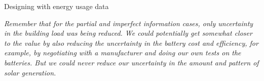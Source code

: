 \begin{ebox}[label=ebox:evii]{Designing with energy usage data}
    {\centering
    \renewcommand{\arraystretch}{1.25}
    \bigskip
    \vspace*{-0.5ex}
    \begin{singlespace}
    \parbox[]{0.8\linewidth}{
     \label{tab:example-voi-summary}
    }

    \vspace*{-0.5ex}
    \raggedright
    \footnotesize{\it Remember that for the partial and imperfect information cases, only uncertainty in the building load was being reduced. We could potentially get somewhat closer to the  value by also reducing the uncertainty in the battery cost and efficiency, for example, by negotiating with a manufacturer and doing our own tests on the batteries. But we could never reduce our uncertainty in the amount and pattern of solar generation.}
    \end{singlespace}
    }

\end{ebox}


